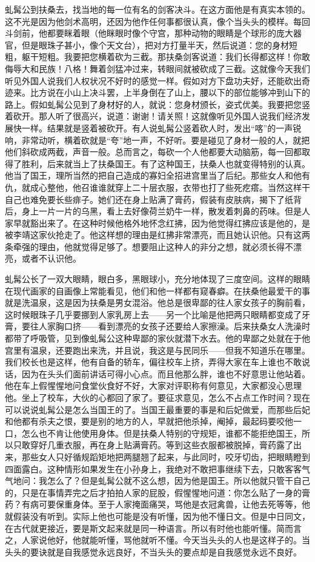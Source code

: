 虬髯公到扶桑去，找当地的每一位有名的剑客决斗。在这方面他是有真实本领的。这不光是因为他剑术高明，还因为他作任何事都很认真，像个当头头的模样。每回斗剑前，他都要眯着眼（他眯眼时像个守宫，那种动物的眼睛是个球形的庞大器官，但是眼珠子甚小，像个天文台），把对方打量半天，然后说道：您的身材短粗，躯干短粗。我要把您横着砍为三截。那扶桑剑客说道：我们长得都这样！你敢侮辱大和民族！八格！舞着剑猛冲过来，转眼间就被砍成了三截。这就像今天我们听见外国人说我们人权状况不好时的感觉一样。假如对方下盘功夫好，还能砍出奇迹来。比方说在小山上决斗罢，上半身倒在了山上，腰以下的部位能够冲到山下的路上。假如虬髯公见到了身材好的人，就说：您身材颁长，姿式优美。我要把您竖着砍开。那人听了很高兴，说道：谢谢！请关照！这就像听见外国人说我们经济发展快一样。结果就是竖着被砍开。有人说虬髯公竖着砍人时，发出“喀”的一声锐响，非常动听，横着砍就是“夸”地一声，不好听。要是碰见了身材一般的人，就把他们斜砍成两截，声音一般。总而言之，每砍一个人他都要大动脑筋，每一回都取得了胜利，后来就当上了扶桑国王。有了这种国王，扶桑人也就变得特别的认真。他当了国王，理所当然的把自己造成的寡妇全招进宫里当了后纪。那些女人和他有仇，就成心整他，他召谁谁就穿上二十层衣服，衣带也打了些死疙瘩。当然这样干自己也难免要长些痱子。她们还在身上贴满了膏药，假装有皮肤病，揭下了纸背后，身上一片一片的乌黑，看上去好像荷兰奶牛一样，散发着刺鼻的药味。但是人家早就豁出来了。在这种时候他格外地怀念红拂，因为他觉得红拂应该是他的，是被李靖这家伙抢走了。他这样想的理由是红拂非常漂亮，而且她认识他。只有这两条牵强的理由，他就觉得足够了。想要阻止这种人的非分之想，就必须长得不漂亮，或者不认识他。 

虬髯公长了一双大眼睛，眼白多，黑眼球小，充分地体现了三度空间。这样的眼睛在现代画家的自画像上常能看见，他们和他一样都有窥春癖。在扶桑他最爱干的事就是洗温泉，这是因为扶桑是男女混浴。他总是很卑鄙的往人家女孩子的胸前看，这时候眼珠子几乎要挪到人家乳房上去——另一个比喻是他把两只眼睛都变成了牙膏，要往人家胸口挤——看到漂亮的女孩子还要给人家擦澡。后来扶桑女人洗澡时都带了呼吸管，见到像虬髯公这种卑鄙的家伙就潜下水去。他的卑鄙之处就在于他宫里有温泉，还要跑出来洗，并且说，我这是与民同乐——但我不知道乐在哪里。我们校长也是这样，他有自备的轿车，偏往校车上挤，弄得大家在车上谁也不敢说话，因为在头头们面前讲话可得小心点。而且他那么胖，谁也不好意思让他站着。他在车上假惺惺地问食堂伙食好不好，大家对评职称有何意见，大家都没心思理他。坐上了校车，大伙的心都回了家了。要征求意见，怎么不占点工作时间？现在可以说说虬髯公是怎么当国王的了。当国王最重要的事是和后妃做爱，而那些后妃和他都有杀夫之恨，要是别的地方的人，早就把他杀掉，阉掉，最起码要咬他一口，怎么也不肯让他使用身体。但是扶桑人特别的守规矩，谁都不能拒绝国王，所以只敢穿好几重衣服，再在身上贴满膏药。等到这些衣服都被脱掉，膏药露了出来，那些女人只好循规蹈矩地把两腿翘了起来，与此同时，咬牙切齿，把眼睛瞪到四面露白。这种情形如果发生在小孙身上，我绝对不敢把事继续下去，只敢客客气气地问：我怎么了？但是虬髯公就不这么想，因为他是国王。所以他就只管干自己的，只是在事情弄完之后才拍拍人家的屁股，假惺惺地问道：你怎么贴了一身的膏药？有病可要保重身体。至于人家掩面痛哭，骂他是衣冠禽兽，让他去死等等，他就假装没有听到。实际上他也可能是没有听懂，因为他不懂日文。但是中日同文，在古代就更接近，要是斯文起来就是同一种语言。所以有时他也能听懂。简而言之，人家说他好，他就能听懂，骂他就听不懂。今天当头头的人也是这样子的。当头头的要诀就是自我感觉永远良好，不当头头的要点却是自我感觉永远不良好。 

